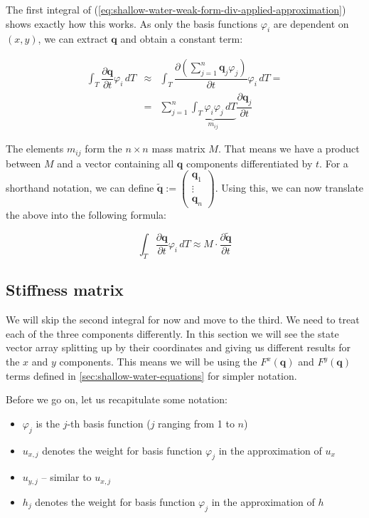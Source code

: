 \documentclass{article}
\newcommand{\pd}[2]{\dfrac{\partial #1}{\partial #2}}
\renewcommand{\phi}{\varphi}
\begin{document}
The first integral of (\ref{eq:shallow-water-weak-form-div-applied-approximation}) shows exactly how this works. As only the basis functions $\phi_i$ are dependent on $(x,y)$, we can extract $\mathbf{q}$ and obtain a constant term:

\begin{eqnarray*}
  \int_T \pd {\mathbf{q}}{t} \phi_i \, dT & \approx &
  \int_T \pd {\left( \sum_{j=1}^n \mathbf{q}_j \phi_j \right) }{t} \phi_i \, dT = \\
  & = & \sum_{j=1}^n \underbrace{\int_T \phi_i \phi_j \, dT}_{m_{ij}} \pd{\mathbf{q}_j}{t}
\end{eqnarray*}

The elements $m_{ij}$ form the $n \times n$ mass matrix $M$. That means we have a product between $M$ and a vector containing all $\mathbf{q}$ components differentiated by $t$. For a shorthand notation, we can define $\tilde{\mathbf{q}} := \begin{pmatrix} \mathbf{q}_1 \\ \vdots \\ \mathbf{q}_n \end{pmatrix}$. Using this, we can now translate the above into the following formula:

\begin{equation*}
  \int_T \pd {\mathbf{q}}{t} \phi_i \, dT \approx
  M \cdot \pd{
    \tilde{\mathbf{q}}}{t}
\end{equation*}

\subsection{Stiffness matrix}
\label{sec:stiffness-matrix}

We will skip the second integral for now and move to the third. We need to treat each of the three components differently. In this section we will see the state vector array splitting up by their coordinates and giving us different results for the $x$ and $y$ components. This means we will be using the $F^x\left(\mathbf{q}\right)$ and $F^y\left(\mathbf{q}\right)$ terms defined in \ref{sec:shallow-water-equations} for simpler notation.

Before we go on, let us recapitulate some notation:
\begin{itemize}
\item $\phi_j$ is the $j$-th basis function ($j$ ranging from 1 to $n$)
\item $u_{x,j}$ denotes the weight for basis function $\phi_j$ in the approximation of $u_x$
\item $u_{y,j}$ -- similar to $u_{x,j}$
\item $h_j$ denotes the weight for basis function $\phi_j$ in the approximation of $h$
\end{itemize}
\end{document}
